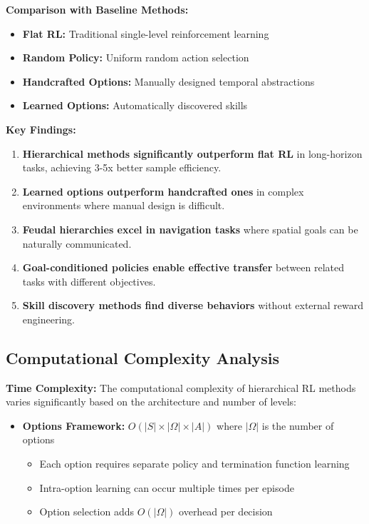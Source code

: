 \documentclass[12pt]{article}
\begin{document}
{{\textbf{Comparison with Baseline Methods:}
\begin{itemize}
    \item \textbf{Flat RL:} Traditional single-level reinforcement learning
    \item \textbf{Random Policy:} Uniform random action selection
    \item \textbf{Handcrafted Options:} Manually designed temporal abstractions
    \item \textbf{Learned Options:} Automatically discovered skills
\end{itemize}

\textbf{Key Findings:}
\begin{enumerate}
    \item \textbf{Hierarchical methods significantly outperform flat RL} in long-horizon tasks, achieving 3-5x better sample efficiency.
    
    \item \textbf{Learned options outperform handcrafted ones} in complex environments where manual design is difficult.
    
    \item \textbf{Feudal hierarchies excel in navigation tasks} where spatial goals can be naturally communicated.
    
    \item \textbf{Goal-conditioned policies enable effective transfer} between related tasks with different objectives.
    
    \item \textbf{Skill discovery methods find diverse behaviors} without external reward engineering.
\end{enumerate}

\subsection{Computational Complexity Analysis}

\textbf{Time Complexity:}
The computational complexity of hierarchical RL methods varies significantly based on the architecture and number of levels:

\begin{itemize}
    \item \textbf{Options Framework:} $O(|S| \times |\Omega| \times |A|)$ where $|\Omega|$ is the number of options
    \begin{itemize}
        \item Each option requires separate policy and termination function learning
        \item Intra-option learning can occur multiple times per episode
        \item Option selection adds $O(|\Omega|)$ overhead per decision
    \end{itemize}
    

\end{itemize}}}
\end{document}
